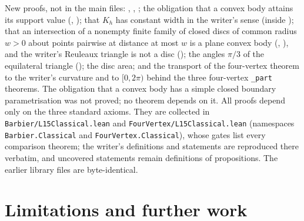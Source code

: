 \documentclass[11pt]{article}
\theoremstyle{definition}
\theoremstyle{remark}
\newcommand{\lean}[1]{\texttt{#1}}
\begin{document}
New proofs, not in the main files: ,
, ;
the obligation that a convex body attains its support value (,
); that $K_h$ has constant width in the writer's sense
(inside ); that an intersection of a nonempty finite family of
closed discs of common radius $w>0$ about points pairwise at distance at most $w$ is a plane convex body
(, ), and the
writer's Reuleaux triangle is not a disc (); the angles $\pi/3$ of
the equilateral triangle (); the disc area; and the transport of
the four-vertex theorem to the writer's curvature and to $[0,2\pi)$ behind the three four-vertex
\lean{\_part} theorems. The obligation that a convex body has a simple closed boundary parametrisation
was not proved; no theorem depends on it. All proofs depend only on the three standard axioms. They
are collected in \lean{Barbier/L15Classical.lean} and \lean{FourVertex/L15Classical.lean} (namespaces
\lean{Barbier.Classical} and \lean{FourVertex.Classical}), whose gates list every comparison theorem;
the writer's definitions and statements are reproduced there verbatim, and uncovered statements remain
definitions of propositions. The earlier library files are byte-identical.

\section{Limitations and further work}\label{sec:limits}
\end{document}
